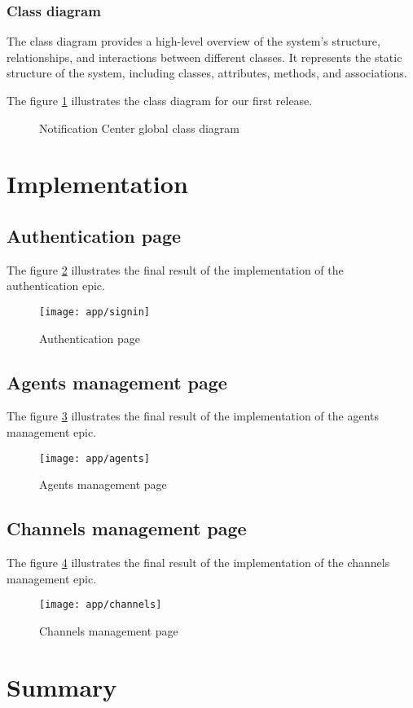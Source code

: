 \subsubsection{Class diagram}
The class diagram provides a high-level overview of the system's structure, relationships,
and interactions between different classes. It represents the static structure of the system,
including classes, attributes, methods, and associations.

The figure \ref{g-class} illustrates the class diagram for our first release.

\begin{figure}[hbt!]
    \centering
    
    \caption{Notification Center global class diagram}
    \label{g-class}
\end{figure}

\section{Implementation}
\subsection{Authentication page}
The figure \ref{ss-signin} illustrates the final result of the implementation of the authentication epic.
\begin{figure}[hbt!]
    \centering
    \texttt{[image: app/signin]}
    \caption{Authentication page}
    \label{ss-signin}
\end{figure}

\subsection{Agents management page}
The figure \ref{ss-agents} illustrates the final result of the implementation of the agents management epic.
\begin{figure}[hbt!]
    \centering
    \texttt{[image: app/agents]}
    \caption{Agents management page}
    \label{ss-agents}
\end{figure}

\subsection{Channels management page}
The figure \ref{ss-channels} illustrates the final result of the implementation of the channels management epic.
\begin{figure}[hbt!]
    \centering
    \texttt{[image: app/channels]}
    \caption{Channels management page}
    \label{ss-channels}
\end{figure}

\section*{Summary}
